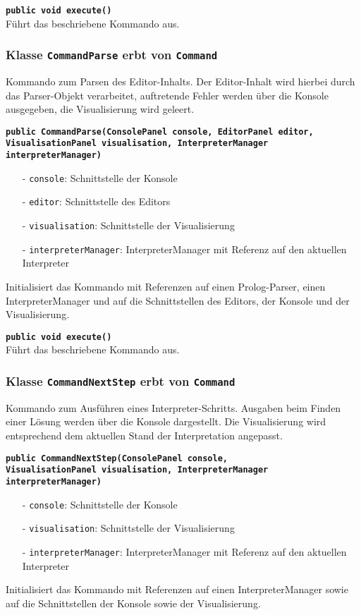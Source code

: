 \documentclass[parskip=full,11pt,twoside]{scrartcl}
\begin{document}
\textbf{\texttt{public void execute()}}\\
Führt das beschriebene Kommando aus.

\subsubsection{Klasse \texttt{CommandParse} erbt von \texttt{Command}}

Kommando zum Parsen des Editor-Inhalts. Der Editor-Inhalt wird hierbei durch das Parser-Objekt verarbeitet, auftretende Fehler werden über die Konsole ausgegeben, die Visualisierung wird geleert.

\textbf{\texttt{public CommandParse(ConsolePanel console, EditorPanel editor,\\VisualisationPanel visualisation, InterpreterManager interpreterManager)}}
\begin{itemize}[noitemsep]
	\item[-] \texttt{console}: Schnittstelle der Konsole
	\item[-] \texttt{editor}: Schnittstelle des Editors
	\item[-] \texttt{visualisation}: Schnittstelle der Visualisierung
	\item[-] \texttt{interpreterManager}: InterpreterManager mit Referenz auf den aktuellen Interpreter
\end{itemize}
Initialisiert das Kommando mit Referenzen auf einen Prolog-Parser, einen InterpreterManager und auf die Schnittstellen des Editors, der Konsole und der Visualisierung.

\textbf{\texttt{public void execute()}}\\
Führt das beschriebene Kommando aus.

\subsubsection{Klasse \texttt{CommandNextStep} erbt von \texttt{Command}}

Kommando zum Ausführen eines Interpreter-Schritts. Ausgaben beim Finden einer Lösung werden über die Konsole dargestellt. Die Visualisierung wird entsprechend dem aktuellen Stand der Interpretation angepasst.

\textbf{\texttt{public CommandNextStep(ConsolePanel console,\\VisualisationPanel visualisation, InterpreterManager interpreterManager)}}
\begin{itemize}[noitemsep]
	\item[-] \texttt{console}: Schnittstelle der Konsole
	\item[-] \texttt{visualisation}: Schnittstelle der Visualisierung
	\item[-] \texttt{interpreterManager}: InterpreterManager mit Referenz auf den aktuellen Interpreter
\end{itemize}
Initialisiert das Kommando mit Referenzen auf einen InterpreterManager sowie auf die Schnittstellen der Konsole sowie der Visualisierung.
\end{document}
